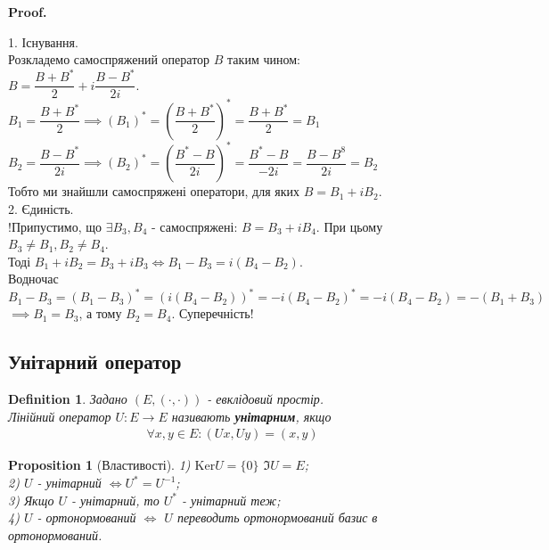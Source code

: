 \documentclass[a4paper, 10pt]{article}
\makeatletter
\def\prp#1{\textbf{Proposition {#1}}}
\def\proof{\textbf{Proof.}\\}
\def\qed{$\blacksquare$}
\def\ker#1{\textrm{Ker} {#1}}
\theoremstyle{theoremdd}
\theoremstyle{theoremdd}
\newtheorem{definition}[theorem]{Definition}
\theoremstyle{theoremdd}
\theoremstyle{theoremdd}
\theoremstyle{theoremdd}
\newtheorem{proposition}[theorem]{Proposition}
\theoremstyle{theoremdd}
\theoremstyle{theoremdd}
\theoremstyle{theoremdd}
\renewenvironment{proof}[1][Proof.\\]{\par
\pushQED{\hfill \qed}%
\normalfont \topsep6\p@\@plus6\p@\relax
\trivlist
\item\relax
{\bfseries
#1\@addpunct{.}}\hspace\labelsep\ignorespaces
}{%
\popQED\endtrivlist\@endpefalse
}
\makeatother
\begin{document}
\begin{proof}
1. Існування.\\
Розкладемо самоспряжений оператор $B$ таким чином:\\
$B = \dfrac{B+B^*}{2}+ i \dfrac{B-B^*}{2i}$.\\
$B_1 = \dfrac{B+B^*}{2} \implies (B_1)^* = \left( \dfrac{B+B^*}{2} \right)^* = \dfrac{B+B^*}{2} = B_1$\\
$B_2 = \dfrac{B-B^*}{2i} \implies (B_2)^* = \left( \dfrac{B^*-B}{2i} \right)^* = \dfrac{B^*-B}{-2i} = \dfrac{B-B^8}{2i} = B_2$\\
Тобто ми знайшли самоспряжені оператори, для яких $B = B_1 + iB_2$.
\bigskip \\
2. Єдиність.\\
!Припустимо, що $\exists B_3, B_4$ - самоспряжені: $B = B_3 + i B_4$. При цьому $B_3 \neq B_1, B_2 \neq B_4$.\\
Тоді $B_1 + iB_2 = B_3 + iB_3 \iff B_1-B_3 = i(B_4-B_2)$.\\
Водночас $B_1-B_3=(B_1-B_3)^* = (i(B_4-B_2))^* = -i(B_4-B_2)^* = -i(B_4-B_2) = -(B_1+B_3)$\\
$\implies B_1 = B_3$, а тому $B_2 = B_4$. Суперечність!
\end{proof}

\iffalse
\prp{5.9.4.} Заданий $E$ - евклідовий простір із $(\cdot,\cdot)$\\
Тоді $\forall B: \exists! B_1$ - самоспряжений, $\exists! B_2$ - кососпряжений, тобто $B_2^* = -B_2$: $B = B_1 + B_2$\\
\proof
Запишемо $B$ таким чином:\\
$B = \dfrac{B+B^*}{2} + \dfrac{B-B^*}{2} = B_1 + B_2$\\
Зрозуміло, що перший - сампоспряжений, а другий - кососпряжений\\
Єдиність доводиться аналогічно \qed
\fi

\subsection{Унітарний оператор}
\begin{definition}
Задано $(E,(\cdot,\cdot))$ - евклідовий простір.\\
Лінійний оператор $U: E \to E$ називають \textbf{унітарним}, якщо
\begin{align*}
\forall x,y \in E: (Ux,Uy) = (x,y)
\end{align*}
\end{definition}

\begin{proposition}[Властивості]
1) $\ker U = \{0\}$ \hspace{1cm} $\Im U = E$;\\
2) $U$ - унітарний $\iff U^* = U^{-1}$;\\
3) Якщо $U$ - унітарний, то $U^*$ - унітарний теж;\\
4) $U$ - ортонормований $\iff$ $U$ переводить ортонормований базис в ортонормований.
\end{proposition}
\end{document}
